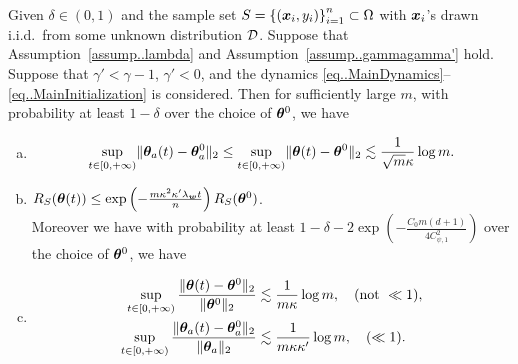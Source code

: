\documentclass{article}
\begin{document}
\begin{prop}\label{prop..ALazyRegime}
    Given $\delta\in(0,1)$ and the sample set $S = {\{(\bm{x}_i, y_i)\}}_{i=1}^n\subset\Omega$ with $\bm{x}_i$'s drawn i.i.d.\ from some unknown distribution $\mathcal{D}$. Suppose that Assumption~\ref{assump..lambda} and Assumption~\ref{assump..gammagamma'} hold.  Suppose that $\gamma'<\gamma-1$, $\gamma'<0$, and the dynamics \eqref{eq..MainDynamics}--\eqref{eq..MainInitialization} is considered. Then for sufficiently large $m$, with probability at least $1-\delta$ over the choice of $\bm{\theta}^0$, we have
    \begin{enumerate}[(a)]
        \item \begin{equation*}
                  \begin{aligned}
                      \sup\limits_{t\in[0,+\infty)}\lVert\bm{\theta}_{a}(t)-\bm{\theta}_{a}^0\rVert_2
                      \leq \sup\limits_{t\in[0,+\infty)}\lVert\bm{\theta}(t)-\bm{\theta}^0\rVert_2
                      \lesssim\frac{1}{\sqrt{m}\kappa}\log m.
                  \end{aligned}
              \end{equation*}
        \item $R_S(\bm{\theta}(t))\leq\exp\left(-\frac{m\kappa^2\kappa'\lambda_{\bm{w}} t}{n}\right)R_S(\bm{\theta}^0)$. \\
              Moreover we have with probability at least $1-\delta-2\exp\left(-\frac{C_0m(d+1)}{4C_{\psi,1}^2}\right)$ over the choice of $\bm{\theta}^0$, we have
        \item \begin{equation*}
                  \begin{aligned}
                      \sup\limits_{t\in[0,+\infty)}\frac{\lVert\bm{\theta}(t)-\bm{\theta}^0\rVert_2}{\lVert\bm{\theta}^0\rVert_2}
                       & \lesssim\frac{1}{m\kappa}\log m, \quad (\text{not }\ll 1), \\
                      \sup\limits_{t\in[0,+\infty)}\frac{\lVert\bm{\theta}_{a}(t)-\bm{\theta}_{a}^0\rVert_2}{\lVert\bm{\theta}_{a}\rVert_2}
                       & \lesssim\frac{1}{m\kappa\kappa'}\log m, \quad (\ll 1).
                  \end{aligned}
              \end{equation*}
    \end{enumerate}
\end{prop}
\end{document}
